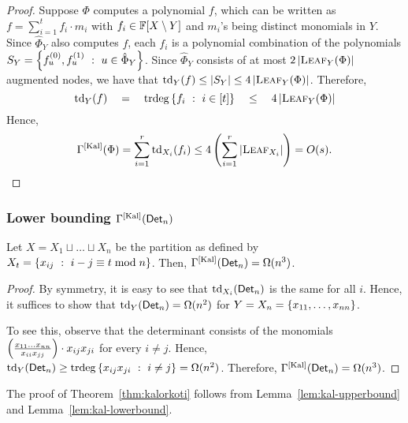 \begin{proof}
  Suppose $\Phi$ computes a polynomial $f$, which can be written as  $f
  = \sum_{i=1}^t f_i\cdot m_i$ with $f_i \in \mathbb{F}[X\setminus Y]$ and $m_i$'s being
  distinct monomials in $Y$. Since $\hat{\Phi}_Y$ also computes $f$, each $f_i$ is a polynomial
  combination of the polynomials $S_Y = \left\{{f_{u}^{(0)},
    f_{u}^{(1)}}\ : \ {u\in \hat{\Phi}_Y}\right\}$. Since $\hat{\Phi}_Y$ consists of at
  most $2\left|\textsc{Leaf}_Y(\Phi)\right|$ augmented nodes, we have that
  $\mathrm{td}_Y(f) \leq |S_Y| \leq 4\left|\textsc{Leaf}_Y(\Phi)\right|$. Therefore, 
  $$
  \mathrm{td}_Y(f) \quad=\quad \mathrm{trdeg}\left\{{f_i}\ : \ {i\in [t]}\right\} \quad\leq\quad 4\left|\textsc{Leaf}_Y(\Phi)\right|
  $$
  Hence, 
  $$\Gamma^{\mathrm{[Kal]}}(\Phi) = \sum_{i=1}^r \mathrm{td}_{X_i}(f_i) \leq 4\left(\sum_{i=1}^r \left|\textsc{Leaf}_{X_i}\right|\right) = O(s).
  $$
\end{proof}

\subsubsection{Lower bounding $\Gamma^{\mathrm{[Kal]}}(\mathsf{Det}_n)$}


\begin{lemma}\label{lem:kal-lowerbound}
  Let $X = X_1 \sqcup \dots \sqcup X_n$ be the partition as defined by
  $X_t = \left\{{x_{ij}}\ : \ {i-j\equiv t\bmod{n}}\right\}$. Then,
  $\Gamma^{\mathrm{[Kal]}}(\mathsf{Det}_n) = \Omega(n^3)$.
\end{lemma}
\begin{proof}
  By symmetry, it is easy to see that $\text{td}_{X_i}(\mathsf{Det}_n)$ is
  the same for all $i$. Hence, it suffices to show that
  $\text{td}_{Y}(\mathsf{Det}_n) = \Omega(n^2)$ for $Y = X_n = \left\{x_{11},\dots, x_{nn}\right\}$. 

  To see this, observe that the determinant consists of the monomials
  $\left(\frac{x_{11}\dots x_{nn}}{x_{ii}x_{jj}}\right)\cdot
  x_{ij}x_{ji}$ for every $i\neq j$. Hence, $\text{td}_{Y}(\mathsf{Det}_n)
  \geq \mathrm{trdeg}\left\{{x_{ij}x_{ji}}\ : \ {i\neq j}\right\} =
  \Omega(n^2)$. Therefore, $\Gamma^{\mathrm{[Kal]}}(\mathsf{Det}_n) =
  \Omega(n^3)$.
\end{proof}

The proof of Theorem~\ref{thm:kalorkoti} follows from
Lemma~\ref{lem:kal-upperbound} and Lemma~\ref{lem:kal-lowerbound}.



